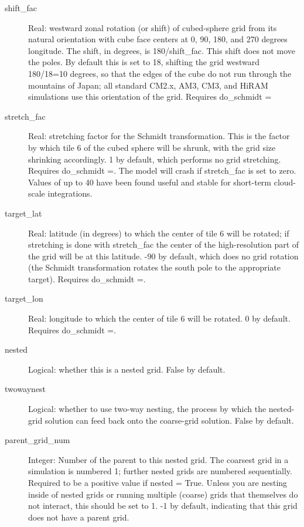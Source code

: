 \documentclass[12pt,letterpaper]{book}
\begin{document}
\begin{description}
\item[shift\_fac] Real: westward zonal rotation (or shift) of cubed-sphere grid from its 
natural orientation with cube face centers at 0, 90, 180, and 270 degrees longitude. The shift, in degrees, is 
180/shift\_fac. This shift does not move the poles. By default this is set to 
18, shifting the grid westward 180/18=10 degrees, so that the edges of the cube do not run through the mountains of Japan; all 
standard CM2.x, AM3, CM3, and HiRAM simulations use this orientation of the grid. Requires do\_schmidt 
=\false  


\item[stretch\_fac] Real: stretching factor for the Schmidt transformation. This is the factor by which tile 
6 of the cubed sphere will be shrunk, with the grid size shrinking accordingly. 
1 by default, which performs no grid stretching. Requires do\_schmidt 
=\true . The model will crash if stretch\_fac is set to zero. Values of up to 
40 have been found useful and stable for short-term cloud-scale integrations.


\item[target\_lat] Real: latitude (in degrees) to which the center of tile 
6 will be rotated; if stretching is done with stretch\_fac the center of the high-resolution part of the grid will be at this latitude. 
-90 by default, which does no grid rotation (the Schmidt transformation rotates the south pole to the appropriate target). Requires do\_schmidt 
=\true  .


\item[target\_lon] Real: longitude to which the center of tile 
6 will be rotated. 0 by default. Requires do\_schmidt =\true  .


\item[nested] Logical: whether this is a nested grid. False by default. 


\item[twowaynest] Logical: whether to use two-way nesting, the process by which the nested-grid solution can feed back onto the coarse-grid solution. False by default. 


\item[parent\_grid\_num] Integer: Number of the parent to this nested grid. The coarsest grid in a simulation is numbered 
1; further nested grids are numbered sequentially. Required to be a positive value if nested 
= True. Unless you are nesting inside of nested grids or running multiple 
(coarse) grids that themselves do not interact, this should be set to 
1. -1 by default, indicating that this grid does not have a parent grid. 



\end{description}
\end{document}
